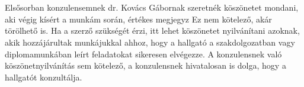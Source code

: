 \chapter*{\koszonetnyilvanitas}

Elsősorban konzulensemnek dr. Kovács Gábornak szeretnék köszönetet mondani, aki végig kísért a munkám során, értékes megjegyz
Ez nem kötelező, akár törölhető is. Ha a szerző szükségét érzi, itt lehet köszönetet nyilvánítani azoknak, akik hozzájárultak munkájukkal ahhoz, hogy a hallgató a szakdolgozatban vagy diplomamunkában leírt feladatokat sikeresen elvégezze. A konzulensnek való köszönetnyilvánítás sem kötelező, a konzulensnek hivatalosan is dolga, hogy a hallgatót konzultálja.